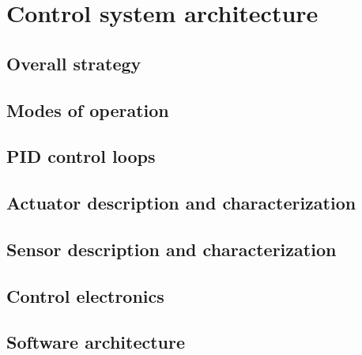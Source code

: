 \section{Control system architecture}
\subsection{Overall strategy}
\subsection{Modes of operation}
\subsection{PID control loops}
\subsection{Actuator description and characterization}
\subsection{Sensor description and characterization}
\subsection{Control electronics}
\subsection{Software architecture}
